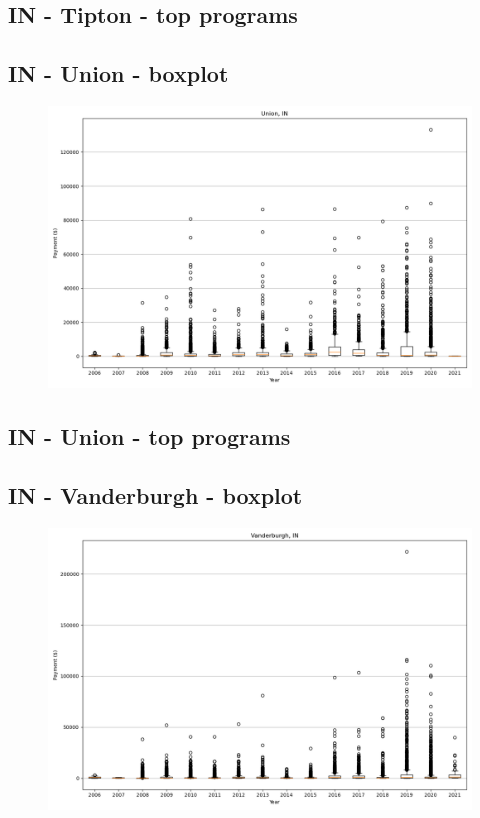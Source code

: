 \subsection*{IN - Tipton - top programs}

\newpage
\subsection*{IN - Union - boxplot}
\begin{figure}[h]
\centering
\includegraphics[width=7in]{../output/boxplots/counties/Union-IN_boxplot.png}
\end{figure}


\subsection*{IN - Union - top programs}

\newpage
\subsection*{IN - Vanderburgh - boxplot}
\begin{figure}[h]
\centering
\includegraphics[width=7in]{../output/boxplots/counties/Vanderburgh-IN_boxplot.png}
\end{figure}


